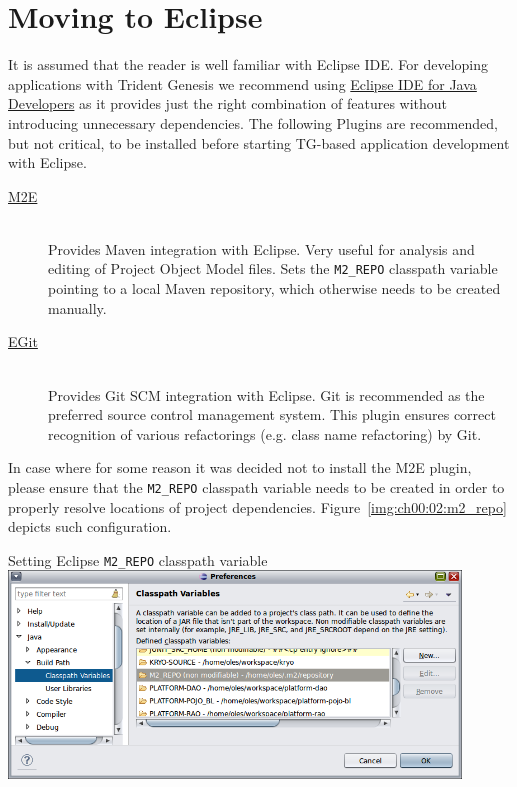 \section{Moving to Eclipse}
  It is assumed that the reader is well familiar with Eclipse IDE.
  For developing applications with Trident Genesis we recommend using \href{http://www.eclipse.org/downloads}{Eclipse IDE for Java Developers} as it provides just the right combination of features without introducing unnecessary dependencies.
  The following Plugins are recommended, but not critical, to be installed before starting TG-based application development with Eclipse.

  \begin{description}
    \item[\href{http://www.eclipse.org/m2e/}{M2E}] \hfill \\
	Provides Maven integration with Eclipse. 
	Very useful for analysis and editing of Project Object Model files.
	Sets the \texttt{M2\_REPO} classpath variable pointing to a local Maven repository, which otherwise needs to be created manually.
    \item[\href{http://www.eclipse.org/egit/}{EGit}] \hfill \\
	Provides Git SCM integration with Eclipse. 
	Git is recommended as the preferred source control management system. 
	This plugin ensures correct recognition of various refactorings (e.g. class name refactoring) by Git.
  \end{description}

  In case where for some reason it was decided not to install the M2E plugin, please ensure that the \texttt{M2\_REPO} classpath variable needs to be created in order to properly resolve locations of project dependencies. 
  Figure~\ref{img:ch00:02:m2_repo} depicts such configuration.

  \begin{image}{Setting Eclipse \texttt{M2\_REPO} classpath variable}{\label{img:ch00:02:m2_repo}}    
    \includegraphics[width=0.9\textwidth]{parts/00-part/chapters/01-application-modules/images/06-eclipse-m2-variable.png}
  \end{image}

